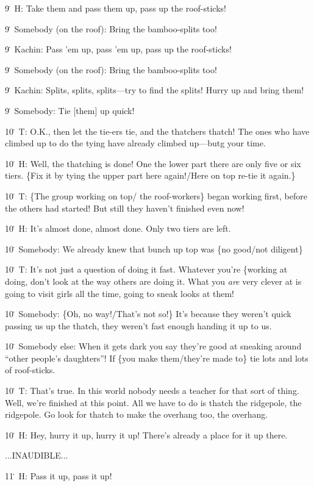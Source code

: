 9\. H: Take them and pass them up, pass up the roof-sticks!

9\. Somebody (on the roof): Bring the bamboo-splits too!

9\. Kachin: Pass 'em up, pass 'em up, pass up the roof-sticks!

9\. Somebody (on the roof): Bring the bamboo-splits too!

9\. Kachin: Splits, splits, splits---try to find the splits!  Hurry up and bring
them!

9\. Somebody: Tie [them] up quick!

10\. T: O.K., then let the tie-ers tie, and the thatchers thatch!  The ones who
have climbed up to do the tying have already climbed up---butg your time.

10\. H: Well, the thatching is done!  One the lower part there are only five or
six tiers.  \{Fix it by tying the upper part here again!/Here on top re-tie it
again.\}

10\. T: \{The group working on top/ the roof-workers\} began working first, before
the others had started!  But still they haven't finished even now!

10\. H: It's almost done, almost done.  Only two tiers are left.

10\. Somebody: We already knew that bunch up top was \{no good/not diligent\}

10\. T: It's not just a question of doing it fast.  Whatever you're \{working at
doing, don't look at the way others are doing it.  What you \textit{are} very clever
at is going to visit girls all the time, going to sneak looks at them!

10\. Somebody: \{Oh, no way!/That's not so!\}  It's because they weren't quick
passing us up the thatch, they weren't fast enough handing it up to us.

10\. Somebody else: When it gets dark you say they're good at sneaking around ``other
people's daughters''!  If \{you make them/they're made to\} tie lots and lots of
roof-sticks.

10\. T: That's true.  In this world nobody needs a teacher for that sort of thing.
Well, we're finished at this point.  All we have to do is thatch the ridgepole,
the ridgepole.  Go look for thatch to make the overhang too, the overhang.

10\. H: Hey, hurry it up, hurry it up!  There's already a place for it up there.

...INAUDIBLE...

11\. H: Pass it up, pass it up!


